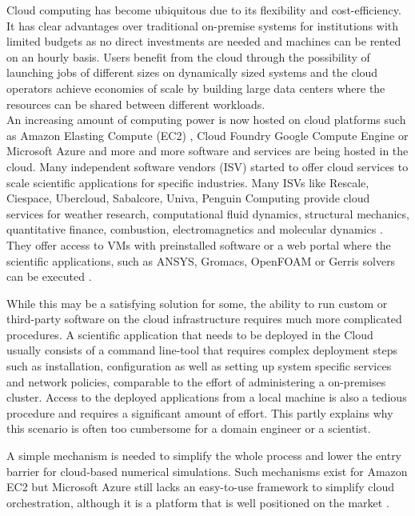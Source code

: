 \documentclass[3p,times]{elsarticle}
\begin{document}
Cloud computing has become ubiquitous due to its flexibility and cost-efficiency. It has clear advantages over traditional on-premise systems for institutions with limited budgets as no direct investments are needed and machines can be rented on an hourly basis. Users benefit from the cloud through the possibility of launching jobs of different sizes on dynamically sized systems and the cloud operators achieve economies of scale by building large data centers where the resources can be shared between different workloads. \\
An increasing amount of computing power is now hosted on cloud platforms such as Amazon Elasting Compute (EC2) \cite{ec2}, Cloud Foundry Google Compute Engine \cite{google} or Microsoft Azure \cite{azure} and more and more software and services are being hosted in the cloud. Many independent software vendors (ISV) started to offer cloud services to scale scientific applications for specific industries. Many ISVs like Rescale, Ciespace, Ubercloud, Sabalcore, Univa, Penguin Computing provide cloud services for weather research, computational fluid dynamics, structural mechanics, quantitative finance, combustion, electromagnetics and molecular dynamics \cite{theuebercloud}. They offer access to VMs with preinstalled software or a web portal where the scientific applications, such as ANSYS, Gromacs, OpenFOAM or Gerris solvers can be executed \cite{Popinet2003}.


While this may be a satisfying solution for some, the ability to run custom or third-party software on the cloud infrastructure requires much more complicated procedures. A scientific application that needs to be deployed in the Cloud usually consists of a command line-tool that requires complex deployment steps such as installation, configuration as well as setting up system specific services and network policies, comparable to the effort of administering a on-premises cluster. Access to the deployed applications from a local machine is also a tedious procedure and requires a significant amount of effort. This partly explains why this scenario is often too cumbersome for a domain engineer or a scientist.  

A simple mechanism is needed to simplify the whole process and lower the entry barrier for cloud-based numerical simulations. Such mechanisms exist for Amazon EC2 \cite{ec2} \cite{eucalyptus} but Microsoft Azure still lacks an easy-to-use framework to simplify cloud  orchestration, although it is a platform that is well positioned on the market \cite{Garg2013}.
\end{document}
